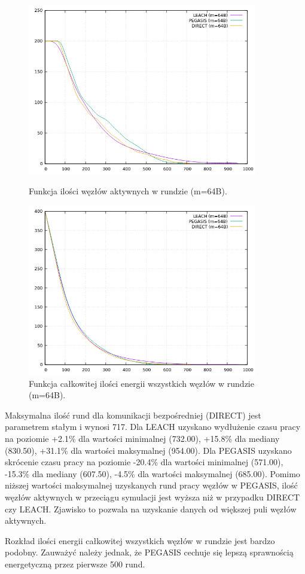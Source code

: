 \documentclass[a4paper,12pt,twoside,openany]{report}
\begin{document}
\begin{figure}[H]
 \centering
 \includegraphics[width=10cm]{images/gnuplot/test_1/nodes_in_round_m64.png}
 \caption{Funkcja ilości węzłów aktywnych w rundzie (m=64B).}
 \includegraphics[width=10cm]{images/gnuplot/test_1/energy_in_round_m64.png}
 \caption{Funkcja całkowitej ilości energii wszystkich węzłów w rundzie (m=64B).}
\end{figure}

\par
Maksymalna ilość rund dla komunikacji bezpośredniej (DIRECT) jest parametrem stałym i wynosi 717.
Dla LEACH uzyskano wydłużenie czasu pracy na poziomie +2.1\% dla wartości minimalnej (732.00), +15.8\% dla mediany (830.50), +31.1\% dla wartości maksymalnej (954.00).
Dla PEGASIS uzyskano skrócenie czasu pracy na poziomie -20.4\% dla wartości minimalnej (571.00), -15.3\% dla mediany (607.50), -4.5\% dla wartości maksymalnej (685.00).
Pomimo niższej wartości maksymalnej uzyskanych rund pracy węzłów w PEGASIS, ilość węzłów aktywnych w przeciągu symulacji jest wyższa niż w przypadku DIRECT czy LEACH.
Zjawisko to pozwala na uzyskanie danych od większej puli węzłów aktywnych.
\par
Rozkład ilości energii całkowitej wszystkich węzłów w rundzie jest bardzo podobny.
Zauważyć należy jednak, że PEGASIS cechuje się lepszą sprawnością energetyczną przez pierwsze 500 rund. 
\end{document}
